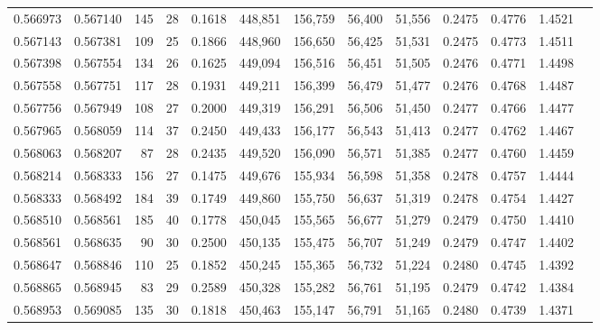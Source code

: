 \begin{tabular}{rrrrrrrrrrrrr}
0.566973 & 0.567140 &    145 &    28 &                                     0.1618 & 448,851 & 156,759 &  56,400 &  51,556 & 0.2475 & 0.4776 & 1.4521 \\
0.567143 & 0.567381 &    109 &    25 &                                     0.1866 & 448,960 & 156,650 &  56,425 &  51,531 & 0.2475 & 0.4773 & 1.4511 \\
0.567398 & 0.567554 &    134 &    26 &                                     0.1625 & 449,094 & 156,516 &  56,451 &  51,505 & 0.2476 & 0.4771 & 1.4498 \\
0.567558 & 0.567751 &    117 &    28 &                                     0.1931 & 449,211 & 156,399 &  56,479 &  51,477 & 0.2476 & 0.4768 & 1.4487 \\
0.567756 & 0.567949 &    108 &    27 &                                     0.2000 & 449,319 & 156,291 &  56,506 &  51,450 & 0.2477 & 0.4766 & 1.4477 \\
0.567965 & 0.568059 &    114 &    37 &                                     0.2450 & 449,433 & 156,177 &  56,543 &  51,413 & 0.2477 & 0.4762 & 1.4467 \\
0.568063 & 0.568207 &     87 &    28 &                                     0.2435 & 449,520 & 156,090 &  56,571 &  51,385 & 0.2477 & 0.4760 & 1.4459 \\
0.568214 & 0.568333 &    156 &    27 &                                     0.1475 & 449,676 & 155,934 &  56,598 &  51,358 & 0.2478 & 0.4757 & 1.4444 \\
0.568333 & 0.568492 &    184 &    39 &                                     0.1749 & 449,860 & 155,750 &  56,637 &  51,319 & 0.2478 & 0.4754 & 1.4427 \\
0.568510 & 0.568561 &    185 &    40 &                                     0.1778 & 450,045 & 155,565 &  56,677 &  51,279 & 0.2479 & 0.4750 & 1.4410 \\
0.568561 & 0.568635 &     90 &    30 &                                     0.2500 & 450,135 & 155,475 &  56,707 &  51,249 & 0.2479 & 0.4747 & 1.4402 \\
0.568647 & 0.568846 &    110 &    25 &                                     0.1852 & 450,245 & 155,365 &  56,732 &  51,224 & 0.2480 & 0.4745 & 1.4392 \\
0.568865 & 0.568945 &     83 &    29 &                                     0.2589 & 450,328 & 155,282 &  56,761 &  51,195 & 0.2479 & 0.4742 & 1.4384 \\
0.568953 & 0.569085 &    135 &    30 &                                     0.1818 & 450,463 & 155,147 &  56,791 &  51,165 & 0.2480 & 0.4739 & 1.4371 \\

\end{tabular}
